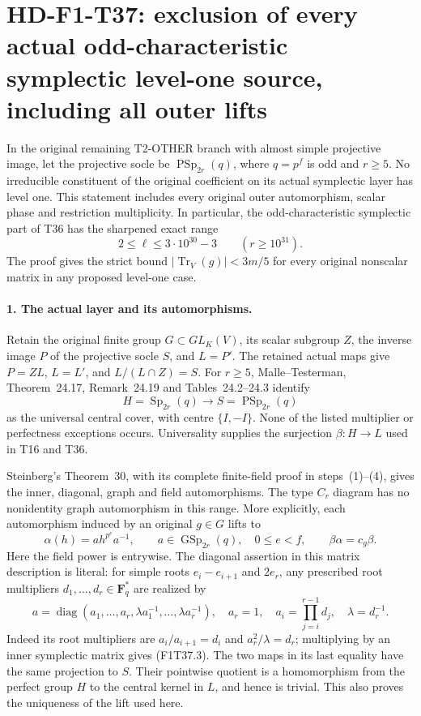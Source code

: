\section[HD-F1-T37: odd symplectic level one]{HD-F1-T37: exclusion of every actual odd-characteristic symplectic level-one source, including all outer lifts}
\label{sec:f1-symplectic-odd-weil-source-exclusion}

In the original remaining T2-OTHER branch with almost simple
projective image, let the projective socle be
\(\operatorname{PSp}_{2r}(q)\), where \(q=p^f\) is odd and
\(r\ge5\). No irreducible constituent of the original coefficient
on its actual symplectic layer has level one. This statement
includes every original outer automorphism, scalar phase and
restriction multiplicity. In particular, the odd-characteristic
symplectic part of T36 has the sharpened exact range
\[
       2\le\ell\le3\cdot10^{30}-3
       \qquad(r\ge10^{31}).
\tag{F1T37.1}
\]
The proof gives the strict bound
\(\lvert\operatorname{Tr}_V(g)\rvert<3m/5\) for every
original nonscalar matrix in any proposed level-one case.

\paragraph{1. The actual layer and its automorphisms.}
Retain the original finite group \(G\subset GL_K(V)\), its
scalar subgroup \(Z\), the inverse image \(P\) of the projective
socle \(S\), and \(L=P'\). The retained actual maps give
\(P=ZL\), \(L=L'\), and \(L/(L\cap Z)=S\).
For \(r\ge5\), Malle--Testerman, Theorem~24.17,
Remark~24.19 and Tables~24.2--24.3 identify
\[
 H=\operatorname{Sp}_{2r}(q)\longrightarrow
 S=\operatorname{PSp}_{2r}(q)
\tag{F1T37.2}
\]
as the universal central cover, with centre \(\{I,-I\}\).
None of the listed multiplier or perfectness exceptions occurs.
Universality supplies the surjection \(\beta:H\to L\) used in
T16 and T36.

Steinberg's Theorem~30, with its complete finite-field proof
in steps~(1)--(4), gives the inner, diagonal, graph and field
automorphisms. The type \(C_r\) diagram has no nonidentity
graph automorphism in this range. More explicitly, each
automorphism induced by an original \(g\in G\) lifts to
\[
 \alpha(h)=a h^{p^e}a^{-1},\qquad
 a\in\operatorname{GSp}_{2r}(q),\quad 0\le e<f,
 \qquad \beta\alpha=c_g\beta.
\tag{F1T37.3}
\]
Here the field power is entrywise. The diagonal assertion in
this matrix description is literal: for simple roots
\(e_i-e_{i+1}\) and \(2e_r\), any prescribed root multipliers
\(d_1,\ldots,d_r\in\mathbf F_q^*\) are realized by
\[
 a=\operatorname{diag}(a_1,\ldots,a_r,
                  \lambda a_1^{-1},\ldots,\lambda a_r^{-1}),
 \quad a_r=1,\quad
 a_i=\prod_{j=i}^{r-1}d_j,\quad \lambda=d_r^{-1}.
\tag{F1T37.4}
\]
Indeed its root multipliers are \(a_i/a_{i+1}=d_i\) and
\(a_r^2/\lambda=d_r\); multiplying by an inner symplectic
matrix gives (F1T37.3). The two maps in its last equality
have the same projection to \(S\). Their pointwise quotient
is a homomorphism from the perfect group \(H\) to the central
kernel in \(L\), and hence is trivial. This also proves the
uniqueness of the lift used here.

